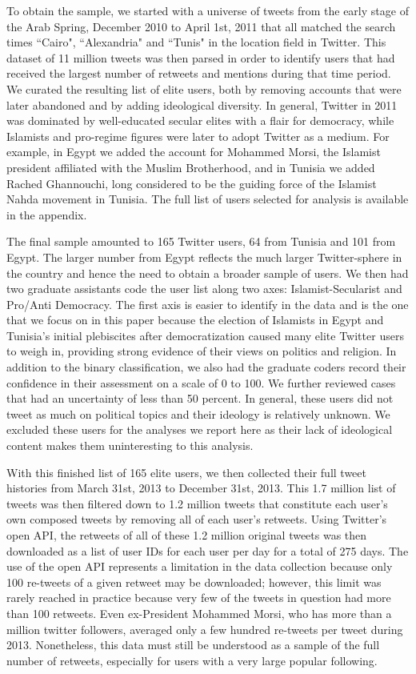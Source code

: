 \documentclass[12pt]{article}
\begin{document}
To obtain the sample, we started with a universe of tweets from the early stage of the Arab Spring, December 2010 to April 1st, 2011 that all matched the search times ``Cairo", ``Alexandria" and ``Tunis" in the location field in Twitter.  This dataset of 11 million tweets was then parsed in order to identify users that had received the largest number of retweets and mentions during that time period. We curated the resulting list of elite users, both by removing accounts that were later abandoned and by adding ideological diversity. In general, Twitter in 2011 was dominated by well-educated secular elites with a flair for democracy, while Islamists and pro-regime figures were later to adopt Twitter as a medium. For example, in Egypt we added the account for Mohammed Morsi, the Islamist president affiliated with the Muslim Brotherhood, and in Tunisia we added Rached Ghannouchi, long considered to be the guiding force of the Islamist Nahda movement in Tunisia. The full list of users selected for analysis is available in the appendix.

The final sample amounted to 165 Twitter users, 64 from Tunisia and 101 from Egypt. The larger number from Egypt reflects the much larger Twitter-sphere in the country and hence the need to obtain a broader sample of users. We then had two graduate assistants code the user list along two axes: Islamist-Secularist and Pro/Anti Democracy. The first axis is easier to identify in the data and is the one that we focus on in this paper because the election of Islamists in Egypt and Tunisia's initial plebiscites after democratization caused many elite Twitter users to weigh in, providing strong evidence of their views on politics and religion. In addition to the binary classification, we also had the graduate coders record their confidence in their assessment on a scale of 0 to 100. We further reviewed cases that had an uncertainty of less than 50 percent. In general, these users did not tweet as much on political topics and their ideology is relatively unknown. We excluded these users for the analyses we report here as their lack of ideological content makes them uninteresting to this analysis.

With this finished list of 165 elite users, we then collected their full tweet histories from March 31st, 2013 to December 31st, 2013. This 1.7 million list of tweets was then filtered down to 1.2 million tweets that constitute each user's own composed tweets by removing all of each user's retweets. Using Twitter's open API, the retweets of all of these 1.2 million original tweets was then downloaded as a list of user IDs for each user per day for a total of 275 days. The use of the open API represents a limitation in the data collection because only 100 re-tweets of a given retweet may be downloaded; however, this limit was rarely reached in practice because very few of the tweets in question had more than 100 retweets. Even ex-President Mohammed Morsi, who has more than a million twitter followers, averaged only a few hundred re-tweets per tweet during 2013. Nonetheless, this data must still be understood as a sample of the full number of retweets, especially for users with a very large popular following.
\end{document}

